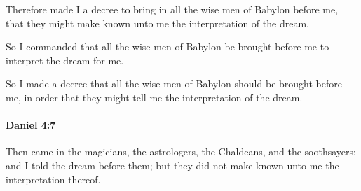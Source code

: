 			\begin{versebox}
					\item[BHS] 
					\item[ASV] Therefore made I a decree to bring in all the wise men of Babylon before me, that they might make known unto me the interpretation of the dream.
					\item[NIV] So I commanded that all the wise men of Babylon be brought before me to interpret the dream for me.
					\item[NRSV] So I made a decree that all the wise men of Babylon should be brought before me, in order that they might tell me the interpretation of the dream.
			\end{versebox}

		\paragraph{Daniel 4:7} %
			\label{DANIEL-4-7}

			Then came in the magicians, the astrologers, the Chaldeans, and the soothsayers: and I told the dream before them; but they did not make known unto me the interpretation thereof.

